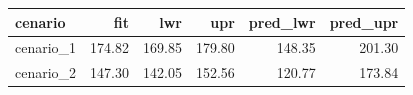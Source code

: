 \begin{table}[ht]
\centering
\begin{tabular}{lrrrrr}
  \hline
cenario & fit & lwr & upr & pred\_lwr & pred\_upr \\ 
  \hline
cenario\_1 & 174.82 & 169.85 & 179.80 & 148.35 & 201.30 \\ 
  cenario\_2 & 147.30 & 142.05 & 152.56 & 120.77 & 173.84 \\ 
   \hline
\end{tabular}
\end{table}
